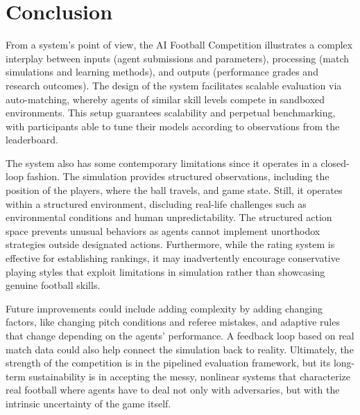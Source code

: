 \section{Conclusion}

From a system's point of view, the AI Football Competition illustrates a complex interplay between inputs (agent submissions and parameters), processing (match simulations and learning methods), and outputs (performance grades and research outcomes). The design of the system facilitates scalable evaluation via auto-matching, whereby agents of similar skill levels compete in sandboxed environments. This setup guarantees scalability and perpetual benchmarking, with participants able to tune their models according to observations from the leaderboard.

The system also has some contemporary limitations since it operates in a closed-loop fashion. The simulation provides structured observations, including the position of the players, where the ball travels, and game state. Still, it operates within a structured environment, discluding real-life challenges such as environmental conditions and human unpredictability. The structured action space prevents unusual behaviors as agents cannot implement unorthodox strategies outside designated actions. Furthermore, while the rating system is effective for establishing rankings, it may inadvertently encourage conservative playing styles that exploit limitations in simulation rather than showcasing genuine football skills.

Future improvements could include adding complexity by adding changing factors, like changing pitch conditions and referee mistakes, and adaptive rules that change depending on the agents' performance. A feedback loop based on real match data could also help connect the simulation back to reality. Ultimately, the strength of the competition is in the pipelined evaluation framework, but its long-term sustainability is in accepting the messy, nonlinear systems that characterize real football where agents have to deal not only with adversaries, but with the intrinsic uncertainty of the game itself.